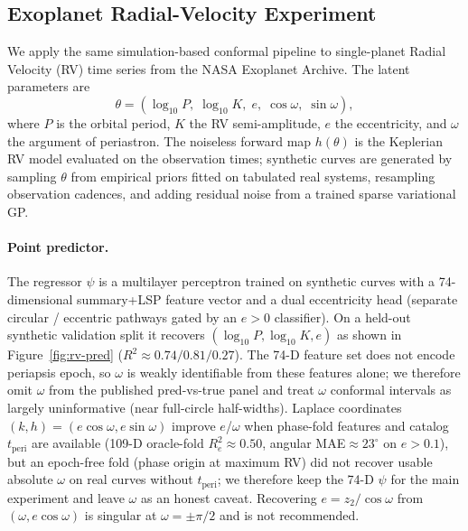 \subsection{Exoplanet Radial-Velocity Experiment}
\label{sec:exoplanet}

We apply the same simulation-based conformal pipeline to single-planet Radial Velocity (RV) time series from the NASA Exoplanet Archive.
The latent parameters are
\[
\theta = (\log_{10} P,\; \log_{10} K,\; e,\; \cos\omega,\; \sin\omega),
\]
where $P$ is the orbital period, $K$ the RV semi-amplitude, $e$ the eccentricity, and $\omega$ the argument of periastron.
The noiseless forward map $h(\theta)$ is the Keplerian RV model evaluated on the observation times; synthetic curves are generated by sampling $\theta$ from empirical priors fitted on tabulated real systems, resampling observation cadences, and adding residual noise from a trained sparse variational GP.

\paragraph{Point predictor.}
The regressor $\psi$ is a multilayer perceptron trained on synthetic curves with a 74-dimensional summary+LSP feature vector and a dual eccentricity head (separate circular / eccentric pathways gated by an $e>0$ classifier).
On a held-out synthetic validation split it recovers $(\log_{10} P, \log_{10} K, e)$ as shown in Figure~\ref{fig:rv-pred} ($R^2\approx 0.74/0.81/0.27$).
The 74-D feature set does not encode periapsis epoch, so $\omega$ is weakly identifiable from these features alone; we therefore omit $\omega$ from the published pred-vs-true panel and treat $\omega$ conformal intervals as largely uninformative (near full-circle half-widths).
Laplace coordinates $(k,h)=(e\cos\omega, e\sin\omega)$ improve $e$/$\omega$ when phase-fold features and catalog $t_{\mathrm{peri}}$ are available (109-D oracle-fold $R^2_e\approx 0.50$, angular MAE$\approx 23^\circ$ on $e>0.1$), but an epoch-free fold (phase origin at maximum RV) did not recover usable absolute $\omega$ on real curves without $t_{\mathrm{peri}}$; we therefore keep the 74-D $\psi$ for the main experiment and leave $\omega$ as an honest caveat.
Recovering $e=z_2/\cos\omega$ from $(\omega, e\cos\omega)$ is singular at $\omega=\pm\pi/2$ and is not recommended.

